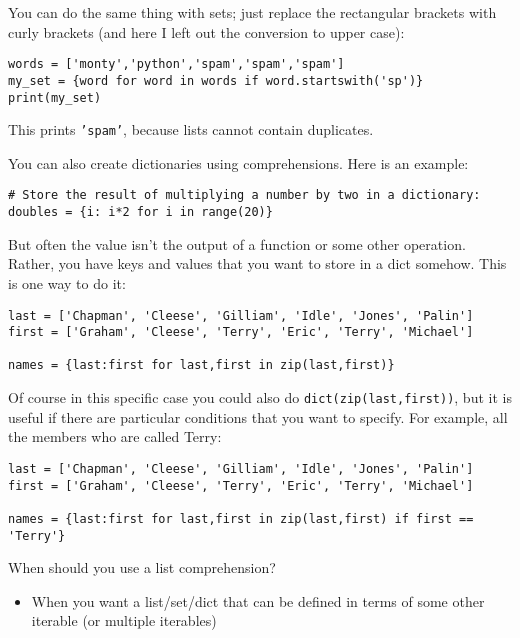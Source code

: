 \documentclass[12pt]{book}
\begin{document}
You can do the same thing with sets; just replace the rectangular brackets with curly brackets (and here I left out the conversion to upper case):

\begin{lstlisting}
words = ['monty','python','spam','spam','spam']
my_set = {word for word in words if word.startswith('sp')}
print(my_set)
\end{lstlisting}

This prints \texttt{'spam'}, because lists cannot contain duplicates.

You can also create dictionaries using comprehensions. Here is an example:

\begin{lstlisting}
# Store the result of multiplying a number by two in a dictionary:
doubles = {i: i*2 for i in range(20)}
\end{lstlisting}

But often the value isn't the output of a function or some other operation. Rather, you have keys and values that you want to store in a dict somehow. This is one way to do it:

\begin{lstlisting}
last = ['Chapman', 'Cleese', 'Gilliam', 'Idle', 'Jones', 'Palin']
first = ['Graham', 'Cleese', 'Terry', 'Eric', 'Terry', 'Michael']

names = {last:first for last,first in zip(last,first)}
\end{lstlisting}

Of course in this specific case you could also do \texttt{dict(zip(last,first))}, but it is useful if there are particular conditions that you want to specify. For example, all the members who are called Terry:

\begin{lstlisting}
last = ['Chapman', 'Cleese', 'Gilliam', 'Idle', 'Jones', 'Palin']
first = ['Graham', 'Cleese', 'Terry', 'Eric', 'Terry', 'Michael']

names = {last:first for last,first in zip(last,first) if first == 'Terry'}
\end{lstlisting}

When should you use a list comprehension?

\begin{itemize}
\item
  When you want a list/set/dict that can be defined in terms of some
  other iterable (or multiple iterables)
\end{itemize}
\end{document}
